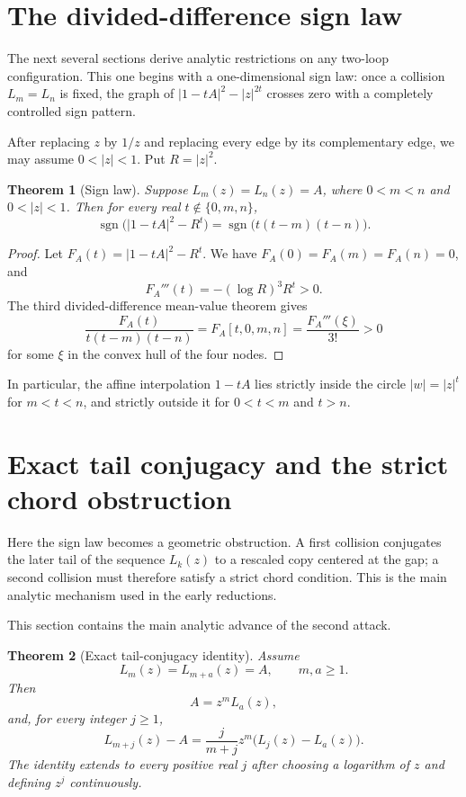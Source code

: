 \documentclass[11pt]{article}
\newtheorem{theorem}{Theorem}[section]
\theoremstyle{definition}
\begin{document}
\section{The divided-difference sign law}

The next several sections derive analytic restrictions on any two-loop configuration.  This one begins with a one-dimensional sign law: once a collision \(L_m=L_n\) is fixed, the graph of \(|1-tA|^2-|z|^{2t}\) crosses zero with a completely controlled sign pattern.

After replacing \(z\) by \(1/z\) and replacing every edge by its complementary
edge, we may assume \(0<|z|<1\).  Put \(R=|z|^2\).

\begin{theorem}[Sign law]\label{thm:sign}
Suppose \(L_m(z)=L_n(z)=A\), where \(0<m<n\) and \(0<|z|<1\).  Then for every
real \(t\notin\{0,m,n\}\),
\[
 \operatorname{sgn}\bigl(|1-tA|^2-R^t\bigr)
 =\operatorname{sgn}\bigl(t(t-m)(t-n)\bigr).
 \tag{5.1}
\]
\end{theorem}

\begin{proof}
Let \(F_A(t)=|1-tA|^2-R^t\).  We have
\(F_A(0)=F_A(m)=F_A(n)=0\), and
\[
 F_A'''(t)=-(\log R)^3R^t>0.
\]
The third divided-difference mean-value theorem gives
\[
 \frac{F_A(t)}{t(t-m)(t-n)}
 =F_A[t,0,m,n]=\frac{F_A'''(\xi)}{3!}>0
\]
for some \(\xi\) in the convex hull of the four nodes.
\end{proof}

In particular, the affine interpolation \(1-tA\) lies strictly inside the
circle \(|w|=|z|^t\) for \(m<t<n\), and strictly outside it for
\(0<t<m\) and \(t>n\).

\section{Exact tail conjugacy and the strict chord obstruction}
\label{sec:tail}

Here the sign law becomes a geometric obstruction.  A first collision conjugates the later tail of the sequence \(L_k(z)\) to a rescaled copy centered at the gap; a second collision must therefore satisfy a strict chord condition.  This is the main analytic mechanism used in the early reductions.

This section contains the main analytic advance of the second attack.

\begin{theorem}[Exact tail-conjugacy identity]\label{thm:tail}
Assume
\[
 L_m(z)=L_{m+a}(z)=A,
 \qquad m,a\geq1.
\]
Then
\begin{equation}
 A=z^mL_a(z),
 \tag{6.1}
\end{equation}
and, for every integer \(j\geq1\),
\begin{equation}
 L_{m+j}(z)-A
 =\frac{j}{m+j}z^m\bigl(L_j(z)-L_a(z)\bigr).
 \tag{6.2}
\end{equation}
The identity extends to every positive real \(j\) after choosing a logarithm
of \(z\) and defining \(z^j\) continuously.
\end{theorem}
\end{document}
